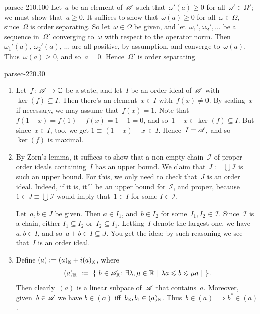 \documentclass[b5page]{book}
\begin{document}
\begin{solution}{parsec-210.100}
Let~$a$ be an element of~$\mathscr{A}$
such that~$\omega'(a)\geq 0$
for all~$\omega'\in \Omega'$;
we must show that~$a\geq 0$.
    It suffices to show that~$\omega(a)\geq 0$
    for all~$\omega\in \Omega$,
    since~$\Omega$ is order separating.
    So let~$\omega\in \Omega$ be given,
    and let~$\omega_1',\omega_2',\dotsc$
    be a sequence in~$\Omega'$ converging to~$\omega$
    with respect to the operator norm.
    Then $\omega_1'(a),\,\omega_2'(a),\,\dotsc$
    are all positive, by assumption, and converge
    to~$\omega(a)$.  Thus~$\omega(a)\geq 0$, and so~$a=0$.
    Hence~$\Omega'$ is order separating.
\end{solution}
\begin{solution}{parsec-220.30}
\begin{enumerate}
\item
Let~$f\colon \mathscr{A}\to\mathbb{C}$ be a state,
and let~$I$ be an order ideal of~$\mathscr{A}$
with~$\ker(f)\subsetneq I$.
Then there's an element~$x\in I$ with~$f(x)\neq 0$.
By scaling~$x$ if necessary,  we may assume that~$f(x)=1$.
Note that~$f(1-x)=f(1)-f(x)=1-1=0$,
and so~$1-x\in\ker(f)\subseteq I$.
But since~$x\in I$, too, we get $1\equiv(1-x)+x\,\in I$.
Hence~$I=\mathscr{A}$, and so~$\ker(f)$ is maximal.
\item
By Zorn's lemma,
it suffices to show that a non-empty
chain~$\mathcal{I}$ of proper order ideals
containing~$I$ has an upper bound.
We claim that $J:=\bigcup\mathcal{I}$
is such an upper bound.
For this, we only need to check that~$J$
is an order ideal.  Indeed,
if it is, it'll be an upper bound for~$\mathcal{I}$,
and proper, because~$1\in J\equiv\bigcup \mathcal{I}$
would imply that~$1\in I$
for some $I \in\mathcal{I}$.

Let~$a,b\in J$
be given.
Then $a\in I_1$, and~$b\in I_2$ for some~$I_1,I_2\in\mathcal{I}$.
Since~$\mathcal{I}$ is a chain,
either $I_1\subseteq I_2$ or~$I_2\subseteq I_1$.
Letting~$I$ denote the largest one,
we have~$a,b\in I$, and so~$a+b\in I\subseteq J$.
You get the idea;
by such reasoning we see that~$I$
is an order ideal.

\item
Define $(a):=(a)_{\mathbb{R}}+i(a)_{\mathbb{R}}$,
where
$$\Real{(a)}\ :=\ \{\ b\in \Real{\scrA}\colon \exists\lambda,\mu\in\R\ 
[ \ \lambda a \leq b \leq \mu a\ ]\ \}.$$
Then clearly~$(a)$ is a linear subpace of~$\mathscr{A}$
that contains~$a$.
Moreover,
given~$b\in\mathscr{A}$
we have $b\in(a)$
iff~$b_{\mathbb{R}},b_{\mathbb{I}}\in (a)_{\mathbb{R}}$.
Thus~$b\in(a)\implies b^*\in (a)$.


\end{enumerate}
\end{solution}
\end{document}
